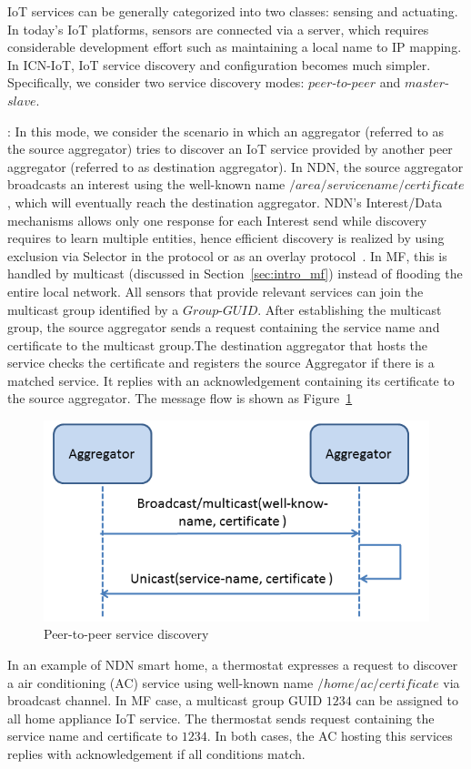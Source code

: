 IoT services can be generally categorized into two classes: sensing and actuating. In today's IoT platforms, sensors are connected via a server, which requires considerable development effort such as maintaining a local name to IP mapping. In ICN-IoT, IoT service discovery and configuration becomes much simpler. Specifically, we consider two service discovery modes: $peer$-$to$-$peer$ and $master$-$slave$.


\vspace{1mm}: In this mode, we consider the scenario in which an aggregator (referred to as the source aggregator) tries to discover an IoT service provided by another peer aggregator (referred to as destination aggregator). In NDN, the source aggregator broadcasts an interest using the well-known name $/area/servicename/certificate$, which will eventually reach the destination aggregator. NDN's Interest/Data mechanisms allows only one response for each Interest send while discovery requires to learn multiple entities, hence efficient discovery is realized by using exclusion via Selector in the protocol or as an overlay protocol~\cite{ravindran2013information}. In MF, this is handled by multicast (discussed in Section~\ref{sec:intro_mf}) instead of flooding the entire local network. All sensors that provide relevant services can join the multicast group identified by a $Group$-$GUID$. After establishing the multicast group, the source aggregator sends a request containing the service name and certificate to the multicast group.The destination aggregator that hosts the service checks the certificate and registers the source Aggregator if there is a matched service. It replies with an acknowledgement containing its certificate to the source aggregator. The message flow is shown as Figure~\ref{fig:ser_dis}
\begin{figure}
\includegraphics[width=\columnwidth]{figure/service_discovery.png}
\caption{\label{fig:ser_dis}Peer-to-peer service discovery}
\end{figure}
In an example of NDN smart home, a thermostat expresses a request to discover a air conditioning (AC) service using well-known name $/home/ac/certificate$ via broadcast channel. In MF case, a multicast group GUID $1234$ can be assigned to all home appliance IoT service. The thermostat sends request containing the service name and certificate to $1234$. In both cases, the AC hosting this services replies with acknowledgement if all conditions match.

